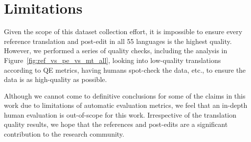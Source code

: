 \section*{Limitations}
Given the scope of this dataset collection effort, it is impossible to ensure every reference translation and post-edit in all 55 languages is the highest quality.
However, we performed a series of quality checks, including the analysis in Figure~\ref{fig:ref_vs_pe_vs_mt_all}, looking into low-quality translations according to QE metrics, having humans spot-check the data, etc., to ensure the data is as high-quality as possible.

Although we cannot come to definitive conclusions for some of the claims in this work due to limitations of automatic evaluation metrics, we feel that an in-depth human evaluation is out-of-scope for this work.
Irrespective of the translation quality results, we hope that the references and post-edits are a significant contribution to the research community.